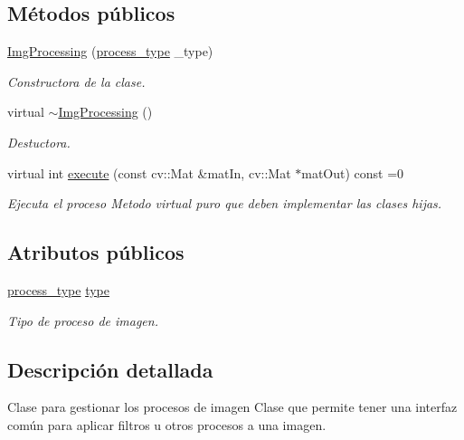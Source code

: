 \subsection*{Métodos públicos}
\begin{DoxyCompactItemize}
\item 
\hyperlink{class_i3_d_1_1_img_processing_a75646e118aa905b04ee812c477c022b6}{Img\+Processing} (\hyperlink{group___img_proc_gaa7be5aaaa0e9ec5885c5bd72f41dad47}{process\+\_\+type} \+\_\+type)
\begin{DoxyCompactList}\small\item\em Constructora de la clase. \end{DoxyCompactList}\item 
virtual \hyperlink{class_i3_d_1_1_img_processing_a5afdc256925dc91966d1d976fdf1a6bc}{$\sim$\+Img\+Processing} ()
\begin{DoxyCompactList}\small\item\em Destuctora. \end{DoxyCompactList}\item 
virtual int \hyperlink{class_i3_d_1_1_img_processing_a74195f05bbf034566e9ff6e10f3af4c9}{execute} (const cv\+::\+Mat \&mat\+In, cv\+::\+Mat $\ast$mat\+Out) const  =0
\begin{DoxyCompactList}\small\item\em Ejecuta el proceso Metodo virtual puro que deben implementar las clases hijas. \end{DoxyCompactList}\end{DoxyCompactItemize}
\subsection*{Atributos públicos}
\begin{DoxyCompactItemize}
\item 
\hyperlink{group___img_proc_gaa7be5aaaa0e9ec5885c5bd72f41dad47}{process\+\_\+type} \hyperlink{class_i3_d_1_1_img_processing_af87bd3404d91bca669b04af1f45cbff0}{type}
\begin{DoxyCompactList}\small\item\em Tipo de proceso de imagen. \end{DoxyCompactList}\end{DoxyCompactItemize}


\subsection{Descripción detallada}
Clase para gestionar los procesos de imagen Clase que permite tener una interfaz común para aplicar filtros u otros procesos a una imagen. 

